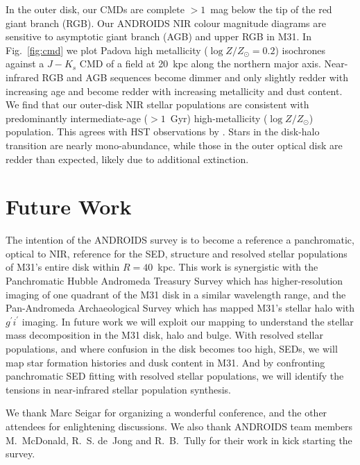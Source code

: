 \documentclass[11pt,twoside]{article}
\begin{document}
In the outer disk, our CMDs are complete $>1$~mag below the tip of the red giant branch (RGB).
Our ANDROIDS NIR colour magnitude diagrams are sensitive to asymptotic giant branch (AGB) and upper RGB in M31.
In Fig.~\ref{fig:cmd} we plot Padova high metallicity ($\log Z/Z_\odot = 0.2$) isochrones \citep{Marigo:2008} against a $J-K_s$ CMD of a field at 20~kpc along the northern major axis.
Near-infrared RGB and AGB sequences become dimmer and only slightly redder with increasing age and become redder with increasing metallicity and dust content.
We find that our outer-disk NIR stellar populations are consistent with predominantly intermediate-age ($>1$~Gyr) high-metallicity ($\log Z/Z_\odot$) population.
This agrees with HST observations by \cite{Brown:2006}.
Stars in the disk-halo transition are nearly mono-abundance, while those in the outer optical disk are redder than expected, likely due to additional extinction.

\section{Future Work}

The intention of the ANDROIDS survey is to become a reference a panchromatic, optical to NIR, reference for the SED, structure and resolved stellar populations of M31's entire disk within $R=40$~kpc.
This work is synergistic with the Panchromatic Hubble Andromeda Treasury Survey \citep[PHAT;][]{Dalcanton:2012} which has higher-resolution imaging of one quadrant of the M31 disk in a similar wavelength range, and the Pan-Andromeda Archaeological Survey \citep[PAndAS;][]{McConnachie:2009} which has mapped M31's stellar halo with $g^\prime i^\prime$ imaging.
In future work we will exploit our mapping to understand the stellar mass decomposition in the M31 disk, halo and bulge.
With resolved stellar populations, and where confusion in the disk becomes too high, SEDs, we will map star formation histories and dusk content in M31.
And by confronting panchromatic SED fitting with resolved stellar populations, we will identify the tensions in near-infrared stellar population synthesis.

\acknowledgements We thank Marc Seigar for organizing a wonderful conference, and the other attendees for enlightening discussions. We also thank ANDROIDS team members M.~McDonald, R.~S. de~Jong and R.~B.~Tully for their work in kick starting the survey.


\end{document}
